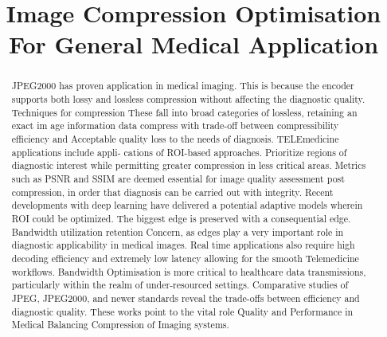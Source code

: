 \documentclass[conference,letterpaper]{IEEEtran}
\begin{document}

\title{Image Compression Optimisation For General Medical Application \\
}\\

\author{
}

\maketitle

\begin{abstract}
JPEG2000 has proven application in medical imaging. This is because the encoder supports both lossy and lossless compression without affecting the diagnostic quality. Techniques for compression These fall into broad categories of lossless, retaining an exact im age information data compress with trade-off between compressibility efficiency and Acceptable quality loss to the needs of diagnosis. TELEmedicine applications include appli- cations of ROI-based approaches. Prioritize regions of diagnostic interest while permitting greater compression in less critical areas.
Metrics such as PSNR and SSIM are deemed
essential for
image quality assessment post compression, in order that
diagnosis can be carried out with integrity. Recent developments with
deep learning have delivered
a potential adaptive models wherein ROI could be optimized.
The biggest edge is preserved with a consequential edge. Bandwidth utilization retention
Concern, as edges play a very important role in diagnostic applicability in
medical images. Real time applications also require high decoding
efficiency and extremely low latency allowing for the smooth
Telemedicine workflows. Bandwidth Optimisation is more critical
to healthcare data transmissions, particularly within the realm
of under-resourced settings. Comparative studies of JPEG,
JPEG2000, and newer standards reveal the trade-offs
between efficiency and diagnostic quality. These works point
to the vital role Quality and Performance in Medical Balancing Compression
of Imaging systems.

\end{abstract}
\end{document}
